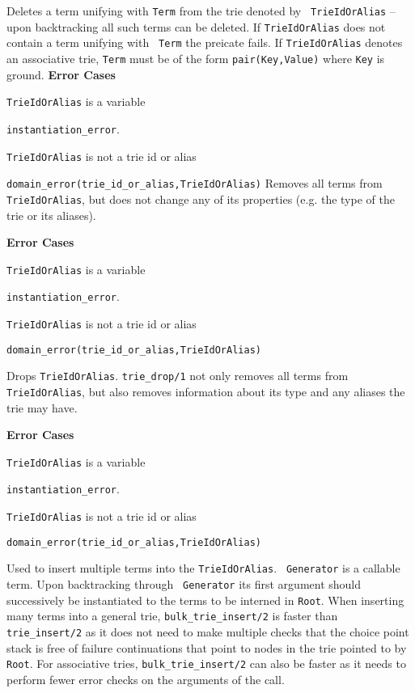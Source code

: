 \begin{description}
%
Deletes a term unifying with {\tt Term} from the trie denoted by {\tt
  TrieIdOrAlias} -- upon backtracking all such terms can be deleted.
If {\tt TrieIdOrAlias} does not contain a term unifying with {\tt
  Term} the preicate fails. If {\tt TrieIdOrAlias} denotes an
associative trie, {\tt Term} must be of the form {\tt pair(Key,Value)}
where {\tt Key} is ground.
%
{\bf Error Cases}
\bi
\item 	{\tt TrieIdOrAlias} is a variable
\bi
\item 	{\tt instantiation\_error}.
\ei
\item 	{\tt TrieIdOrAlias} is not a trie id or alias
\bi
\item 	{\tt domain\_error(trie\_id\_or\_alias,TrieIdOrAlias)}
\ei
\ei
%
%
Removes all terms from {\tt TrieIdOrAlias}, but does not change any of
its properties (e.g. the type of the trie or its aliases).  

{\bf Error Cases}
\bi
\item 	{\tt TrieIdOrAlias} is a variable
\bi
\item 	{\tt instantiation\_error}.
\ei
\item 	{\tt TrieIdOrAlias} is not a trie id or alias
\bi
\item 	{\tt domain\_error(trie\_id\_or\_alias,TrieIdOrAlias)}
\ei
\ei

%
Drops {\tt TrieIdOrAlias}.  {\tt trie\_drop/1} not only removes all
terms from {\tt TrieIdOrAlias}, but also removes information about its
type and any aliases the trie may have.

{\bf Error Cases}
\bi
\item 	{\tt TrieIdOrAlias} is a variable
\bi
\item 	{\tt instantiation\_error}.
\ei
\item 	{\tt TrieIdOrAlias} is not a trie id or alias
\bi
\item 	{\tt domain\_error(trie\_id\_or\_alias,TrieIdOrAlias)}
\ei
\ei

% 
Used to insert multiple terms into the {\tt TrieIdOrAlias}.  {\tt
  Generator} is a callable term.  Upon backtracking through {\tt
  Generator} its first argument should successively be instantiated to
the terms to be interned in {\tt Root}.  When inserting many terms
into a general trie, {\tt bulk\_trie\_insert/2} is faster than {\tt
  trie\_insert/2} as it does not need to make multiple checks that the
choice point stack is free of failure continuations that point to
nodes in the trie pointed to by {\tt Root}.  For associative tries,
{\tt bulk\_trie\_insert/2} can also be faster as it needs to perform
fewer error checks on the arguments of the call.


\end{description}
